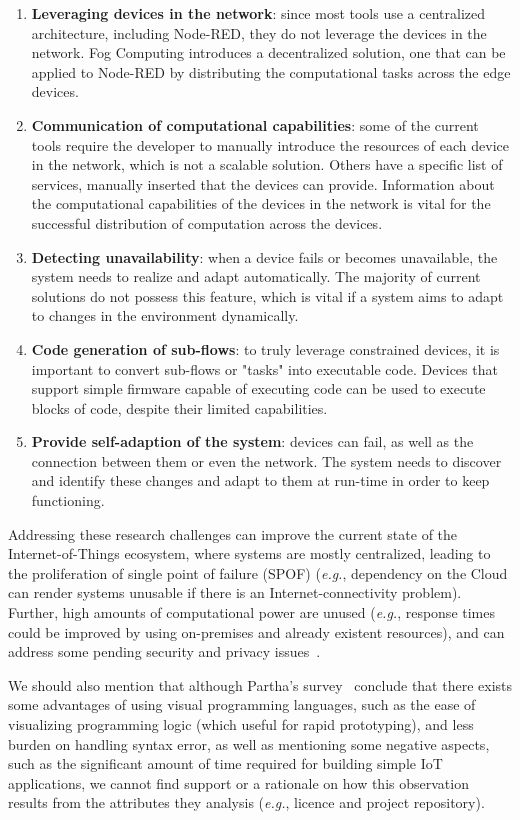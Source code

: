 \begin{enumerate}
    \item \textbf{Leveraging devices in the network}: since most tools use a centralized architecture, including Node-RED, they do not leverage the devices in the network. Fog Computing introduces a decentralized solution, one that can be applied to Node-RED by distributing the computational tasks across the edge devices.
    \item \textbf{Communication of computational capabilities}: some of the current tools require the developer to manually introduce the resources of each device in the network, which is not a scalable solution. Others have a specific list of services, manually inserted that the devices can provide. Information about the computational capabilities of the devices in the network is vital for the successful distribution of computation across the devices.
    \item \textbf{Detecting unavailability}: when a device fails or becomes unavailable, the system needs to realize and adapt automatically. The majority of current solutions do not possess this feature, which is vital if a system aims to adapt to changes in the environment dynamically.
    \item \textbf{Code generation of sub-flows}: to truly leverage constrained devices, it is important to convert sub-flows or "tasks" into executable code. Devices that support simple firmware capable of executing code can be used to execute blocks of code, despite their limited capabilities.
    \item \textbf{Provide self-adaption of the system}: devices can fail, as well as the connection between them or even the network. The system needs to discover and identify these changes and adapt to them at run-time in order to keep functioning.
\end{enumerate}

Addressing these research challenges can improve the current state of the Internet-of-Things ecosystem, where systems are mostly centralized, leading to the proliferation of single point of failure (SPOF) (\emph{e.g.}, dependency on the Cloud can render systems unusable if there is an Internet-connectivity problem). Further, high amounts of computational power are unused (\emph{e.g.}, response times could be improved by using on-premises and already existent resources), and can address some pending security and privacy issues~\cite{nocloud}.

We should also mention that although Partha's survey~\cite{survey_vpl_iot} conclude that there exists some advantages of using visual programming languages, such as the ease of visualizing programming logic (which useful for rapid prototyping), and less burden on handling syntax error, as well as mentioning some negative aspects, such as the significant amount of time required for building simple IoT applications, we cannot find support or a rationale on how this observation results from the attributes they analysis (\emph{e.g.}, licence and project repository).


